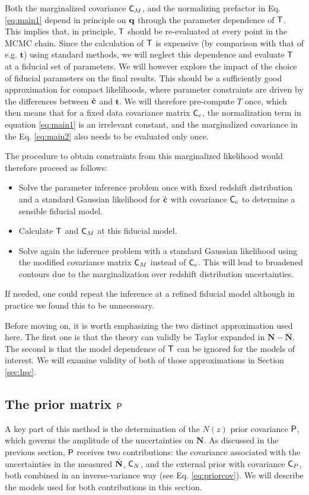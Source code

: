 \documentclass[a4paper,11pt]{article}
\newcommand{\vt}{\mathbf{t}}
\newcommand{\vN}{\mathbf{N}}
\begin{document}
      Both the marginalized covariance ${\sf C}_M$, and the normalizing prefactor in Eq. \ref{eq:main1} depend in principle on ${\bf q}$ through the parameter dependence of ${\sf T}$. This implies that, in principle, ${\sf T}$ should be re-evaluated at every point in the MCMC chain. Since the calculation of ${\sf T}$ is expensive (by comparison with that of e.g. $\vt$) using standard methods, we will neglect this dependence and evaluate ${\sf T}$ at a fiducial set of parameters. We will however explore the impact of the choice of fiducial parameters on the final results. This should be a sufficiently good approximation for compact likelihoods, where parameter constraints are driven by the differences between $\hat{\bf c}$ and $\vt$. We will therefore pre-compute $T$ once, which then means that for a fixed data covariance matrix ${\sf C}_c$, the normalization term in equation \ref{eq:main1} is an irrelevant constant, and the marginalized covariance in the Eq. \ref{eq:main2} also needs to be evaluated only once.

      The procedure to obtain constraints from this marginalized likelihood would therefore proceed as follows:
      \begin{itemize}
        \item Solve the parameter inference problem once with fixed redshift distribution and a standard Gaussian likelihood for $\hat{\bf c}$ with covariance ${\sf C}_c$ to determine a sensible fiducial model.
        \item Calculate ${\sf T}$ and ${\sf C}_M$ at this fiducial model.
        \item Solve again the inference problem with a standard Gaussian likelihood using the modified covariance matrix ${\sf C}_M$ instead of ${\sf C}_c$. This will lead to broadened contours due to the marginalization over redshift distribution uncertainties.
      \end{itemize}
      If needed, one could repeat the inference at a refined fiducial model although in practice we found this to be unnecessary.

      Before moving on, it is worth emphasizing the two distinct approximation used here. The first one is that the theory can validly be Taylor expanded in $\vN-\bar{\vN}$. The second is that the model dependence of ${\sf T}$ can be ignored for the models of interest. We will examine validity of both of those approximations in Section \ref{sec:hsc}.
      
    \subsection{The prior matrix ${\sf P}$}\label{ssec:theory.prior}
      A key part of this method is the determination of the $N(z)$ prior covariance ${\sf P}$, which governs the amplitude of the uncertainties on $\vN$. As discussed in the previous section, ${\sf P}$ receives two contributions: the covariance associated with the uncertainties in the measured $\hat{\bf N}$, ${\sf C}_N$, and the external prior with covariance ${\sf C}_P$, both combined in an inverse-variance way (see Eq. \ref{eq:priorcov}). We will describe the models used for both contributions in this section.
\end{document}
